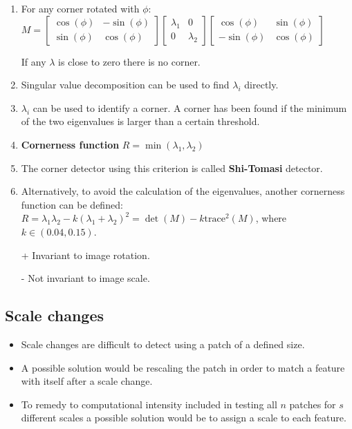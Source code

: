 \documentclass[10pt,a4paper]{scrartcl}
\begin{document}
\begin{multicols*}{2}
\begin{enumerate}
\item For any corner rotated with $\phi$: $M=\begin{bmatrix}
\cos(\phi)&-\sin(\phi)\\\sin(\phi)&\cos(\phi)
\end{bmatrix}
\begin{bmatrix}
\lambda_1&0\\0&\lambda_2
\end{bmatrix}
\begin{bmatrix}
\cos(\phi)&\sin(\phi)\\-\sin(\phi)&\cos(\phi)
\end{bmatrix}$

If any $\lambda$ is close to zero there is no corner.

\item Singular value decomposition can be used to find $\lambda_i$ directly.
\item $\lambda_i$ can be used to identify a corner. A corner has been found if the minimum of the two eigenvalues is larger than a certain threshold.
\item \textbf{Cornerness function} $R=\min(\lambda_1,\lambda_2)$

\item The corner detector using this criterion is called \textbf{Shi-Tomasi} detector.
\item Alternatively, to avoid the calculation of the eigenvalues, another cornerness function can be defined: $R=\lambda_1\lambda_2-k(\lambda_1+\lambda_2)^2=\det(M)-k\text{trace}^2(M)$, where $k\in(0.04,0.15)$.
\end{enumerate}

\begin{itemize}
\item[+] Invariant to image rotation.
\item[-] Not invariant to image scale.
\end{itemize}

\subsection{Scale changes}

\begin{itemize}
\item Scale changes are difficult to detect using a patch of a defined size.
\item A possible solution would be rescaling the patch in order to match a feature with itself after a scale change.
\item To remedy to computational intensity included in testing all $n$ patches for $s$ different scales a possible solution would be to assign a scale to each feature.
\end{itemize}


\end{multicols*}
\end{document}

